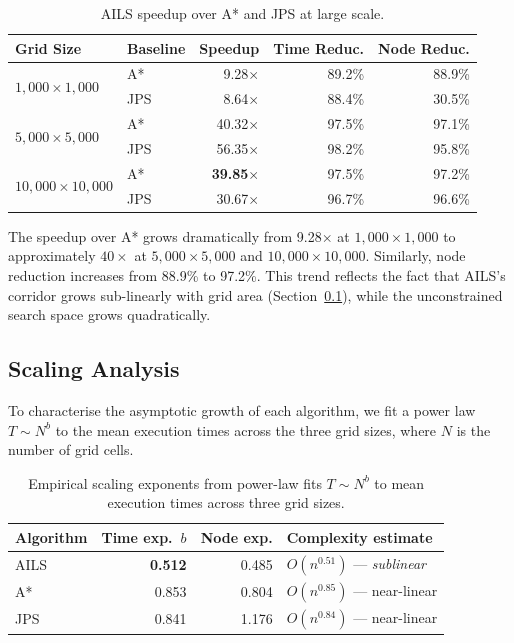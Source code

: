 \documentclass[journal]{IEEEtran}
\begin{document}
\begin{table}[h]
\centering
\caption{AILS speedup over A* and JPS at large scale.}
\label{tab:large_scale_speedup}
\footnotesize
\begin{tabular}{llrrr}
\toprule
Grid Size & Baseline & Speedup & Time Reduc. & Node Reduc. \\
\midrule
\multirow{2}{*}{$1{,}000{\times}1{,}000$}
 & A*  & 9.28$\times$         & 89.2\% & 88.9\% \\
 & JPS & 8.64$\times$         & 88.4\% & 30.5\% \\
\midrule
\multirow{2}{*}{$5{,}000{\times}5{,}000$}
 & A*  & 40.32$\times$        & 97.5\% & 97.1\% \\
 & JPS & 56.35$\times$        & 98.2\% & 95.8\% \\
\midrule
\multirow{2}{*}{$10{,}000{\times}10{,}000$}
 & A*  & \textbf{39.85$\times$} & 97.5\% & 97.2\% \\
 & JPS & 30.67$\times$        & 96.7\% & 96.6\% \\
\bottomrule
\end{tabular}
\normalsize
\end{table}

The speedup over A* grows dramatically from 9.28$\times$ at $1{,}000{\times}1{,}000$ to approximately $40{\times}$ at $5{,}000{\times}5{,}000$ and $10{,}000{\times}10{,}000$.
Similarly, node reduction increases from 88.9\% to 97.2\%.
This trend reflects the fact that AILS's corridor grows sub-linearly with grid area (Section~\ref{sec:large_scale_scaling}), while the unconstrained search space grows quadratically.

\subsection{Scaling Analysis}
\label{sec:large_scale_scaling}

To characterise the asymptotic growth of each algorithm, we fit a power law $T \sim N^b$ to the mean execution times across the three grid sizes, where $N$ is the number of grid cells.

\begin{table}[h]
\centering
\caption{Empirical scaling exponents from power-law fits $T \sim N^b$ to mean execution times across three grid sizes.}
\label{tab:scaling_exponents}
\footnotesize
\begin{tabular}{lrrl}
\toprule
Algorithm & Time exp.\ $b$ & Node exp. & Complexity estimate \\
\midrule
AILS & \textbf{0.512} & 0.485 & $O(n^{0.51})$ --- \emph{sublinear} \\
A*   & 0.853 & 0.804 & $O(n^{0.85})$ --- near-linear \\
JPS  & 0.841 & 1.176 & $O(n^{0.84})$ --- near-linear \\
\bottomrule
\end{tabular}
\normalsize
\end{table}
\end{document}
